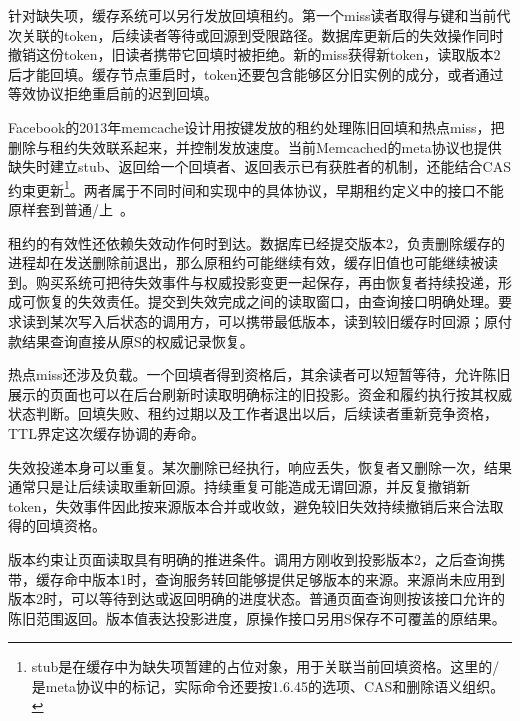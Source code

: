 针对缺失项，缓存系统可以另行发放回填租约。第一个miss读者取得与键和当前代次关联的token，后续读者等待或回源到受限路径。数据库更新后的失效操作同时撤销这份token，旧读者携带它回填时被拒绝。新的miss获得新token，读取版本2后才能回填。缓存节点重启时，token还要包含能够区分旧实例的成分，或者通过等效协议拒绝重启前的迟到回填。


Facebook的2013年memcache设计用按键发放的租约处理陈旧回填和热点miss，把删除与租约失效联系起来，并控制发放速度。当前Memcached的meta协议也提供缺失时建立stub、返回给一个回填者、返回表示已有获胜者的机制，还能结合CAS约束更新\footnote{stub是在缓存中为缺失项暂建的占位对象，用于关联当前回填资格。这里的/是meta协议中的标记，实际命令还要按1.6.45的选项、CAS和删除语义组织。}。两者属于不同时间和实现中的具体协议，早期租约定义中的接口不能原样套到普通/上~\cite{memcache-facebook2013,memcached1645-protocol}。

租约的有效性还依赖失效动作何时到达。数据库已经提交版本2，负责删除缓存的进程却在发送删除前退出，那么原租约可能继续有效，缓存旧值也可能继续被读到。购买系统可把待失效事件与权威投影变更一起保存，再由恢复者持续投递，形成可恢复的失效责任。提交到失效完成之间的读取窗口，由查询接口明确处理。要求读到某次写入后状态的调用方，可以携带最低版本，读到较旧缓存时回源；原付款结果查询直接从原S的权威记录恢复。


热点miss还涉及负载。一个回填者得到资格后，其余读者可以短暂等待，允许陈旧展示的页面也可以在后台刷新时读取明确标注的旧投影。资金和履约执行按其权威状态判断。回填失败、租约过期以及工作者退出以后，后续读者重新竞争资格，TTL界定这次缓存协调的寿命。

失效投递本身可以重复。某次删除已经执行，响应丢失，恢复者又删除一次，结果通常只是让后续读取重新回源。持续重复可能造成无谓回源，并反复撤销新token，失效事件因此按来源版本合并或收敛，避免较旧失效持续撤销后来合法取得的回填资格。

版本约束让页面读取具有明确的推进条件。调用方刚收到投影版本2，之后查询携带，缓存命中版本1时，查询服务转回能够提供足够版本的来源。来源尚未应用到版本2时，可以等待到达或返回明确的进度状态。普通页面查询则按该接口允许的陈旧范围返回。版本值表达投影进度，原操作接口另用S保存不可覆盖的原结果。
\FloatBarrier
